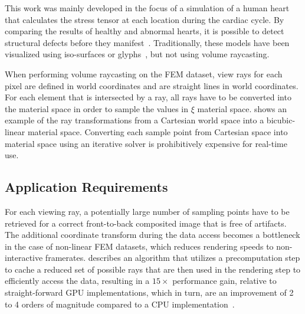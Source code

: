 This work was mainly developed in the focus of a simulation of a human heart that calculates the stress tensor at each location during the cardiac cycle.  By comparing the results of healthy and abnormal hearts, it is possible to detect structural defects before they manifest~\cite{young1992three, young1995tracking}. Traditionally, these models have been visualized using iso-surfaces or glyphs~\cite{wunsche2003visualization}, but not using volume raycasting.

When performing volume raycasting on the FEM dataset, view rays for each pixel are defined in world coordinates and are straight lines in world coordinates.  For each element that is intersected by a ray, all rays have to be converted into the material space in order to sample the values in $\xi$ material space.   shows an example of the ray transformations from a Cartesian world space into a bicubic-linear material space.  Converting each sample point from Cartesian space into material space using an iterative solver is prohibitively expensive for real-time use.


\subsection{Application Requirements} \label{contributions:fem:requirements}
For each viewing ray, a potentially large number of sampling points have to be retrieved for a correct front-to-back composited image that is free of artifacts.  The additional coordinate transform during the data access becomes a bottleneck in the case of non-linear FEM datasets, which reduces rendering speeds to non-interactive framerates.   describes an algorithm that utilizes a precomputation step to cache a reduced set of possible rays that are then used in the rendering step to efficiently access the data, resulting in a $15\times$ performance gain, relative to straight-forward GPU implementations, which in turn, are an improvement of 2 to 4 orders of magnitude compared to a CPU implementation~\cite{liu12gpu}.







